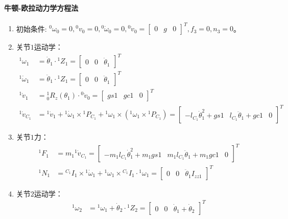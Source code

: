 \documentclass[
12pt, %
a4paper, 
oneside, %
headinclude,footinclude, %
]{scrartcl}
\begin{document}
{\paragraph{牛顿-欧拉动力学方程法}
\begin{enumerate}
\item 初始条件: $ {}^0 \omega_0 = 0, {}^0 v_0 = 0, {}^0 \dot{\omega}_0 = 0, {}^0 \dot{v}_0 = \begin{bmatrix} 0 & g & 0 \end{bmatrix}^T, f_3 = 0, n_3 = 0 $。
\item 关节$ 1 $运动学：
\begin{align*}
{}^1 \omega_1 &= \dot{\theta}_1 \cdot {}^1 Z_1 = \begin{bmatrix} 0 & 0 & \dot{\theta}_1 \end{bmatrix}^T \\
{}^1 \dot{\omega}_1 &= \ddot{\theta}_1 \cdot {}^1 Z_1 = \begin{bmatrix} 0 & 0 & \ddot{\theta}_1 \end{bmatrix}^T \\
{}^1 \dot{v}_1 &= {}^1_0 R_z(\theta_1) \cdot {}^0 \dot{v}_0 = \begin{bmatrix} gs1 & gc1 & 0 \end{bmatrix}^T \\
{}^1 \dot{v}_{C_1} &= {}^1 \dot{v}_1 + {}^1 \dot{\omega}_1 \times {}^1 P_{C_1} + {}^1 \omega_1 \times ({}^1 \omega_1 \times {}^1 P_{C_1}) = \begin{bmatrix} -l_{C_1} \dot{\theta}_1^2 + gs1 & l_{C_1} \ddot{\theta}_1 + gc1 & 0 \end{bmatrix}^T
\end{align*}
\item 关节$ 1 $力：
\begin{align*}
{}^1 F_1 &= m_1 {}^1\dot{v}_{C_1} = \begin{bmatrix} -m_1 l_{C_1} \dot{\theta}_1^2 + m_1 gs1 & m_1 l_{C_1} \ddot{\theta}_1 + m_1 gc1 & 0 \end{bmatrix}^T \\
{}^1 N_1 &= {}^{C_1}I_1 \times {}^1 \dot{\omega}_1 + {}^1 \omega_1 \times {}^{C_1}I_1 \cdot {}^1 \omega_1 = \begin{bmatrix} 0 & 0 & \ddot{\theta}_1 I_{zz1} \end{bmatrix}^T
\end{align*}
\item 关节$ 2 $运动学：
\begin{align*}
{}^1 \omega_2 &= {}^1 \omega_1 + \dot{\theta}_2 \cdot {}^1 Z_2 = \begin{bmatrix} 0 & 0 & \dot{\theta}_1 + \dot{\theta}_2 \end{bmatrix}^T \\

\end{align*}
\end{enumerate}}
\end{document}
